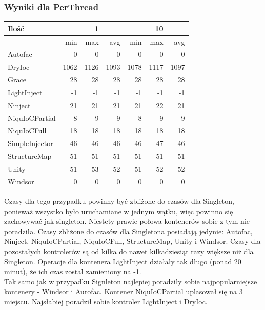 \documentclass[12pt]{article}
\begin{document}
\subsubsection{Wyniki dla PerThread}
\begin{center}
\begin{small}
	\begin{tabular}{ | l | r r r | r r r | }
    		\hline
     		Ilość & & 1 & & & 10 &  \\ \hline
     		 & min & max & avg & min & max & avg \\ \hline
		Autofac & 0 & 0 & 0 & 0 & 0 & 0 \\ \hline
		DryIoc & 1062 & 1126 & 1093 & 1078 & 1117 & 1097 \\ \hline
		Grace & 28 & 28 & 28 & 28 & 28 & 28 \\ \hline
		LightInject & -1 & -1 & -1 & -1 & -1 & -1 \\ \hline
		Ninject & 21 & 21 & 21 & 21 & 22 & 21 \\ \hline
		NiquIoCPartial & 8 & 9 & 9 & 8 & 9 & 9 \\ \hline
		NiquIoCFull & 18 & 18 & 18 & 18 & 18 & 18 \\ \hline
		SimpleInjector & 46 & 46 & 46 & 46 & 47 & 46 \\ \hline
		StructureMap & 51 & 51 & 51 & 51 & 51 & 51 \\ \hline
		Unity & 51 & 53 & 52 & 51 & 52 & 52 \\ \hline
		Windsor & 0 & 0 & 0 & 0 & 0 & 0 \\
    		\hline
  	\end{tabular}
\end{small}
\end{center}
Czasy dla tego przypadku powinny być zbliżone do czasów dla Singleton, ponieważ wszystko było uruchamiane w jednym wątku, więc powinno się zachowywać jak singleton. Niestety prawie połowa kontenerów sobie z tym nie poradziła. Czasy zbliżone do czasów dla Singletona posiadają jedynie: Autofac, Ninject, NiquIoCPartial, NiquIoCFull, StructureMap, Unity i Windsor. Czasy dla pozostałych kontrolerów są od kilka do nawet kilkadziesiąt razy większe niż dla Singleton. Operacje dla kontenera LightInject działały tak długo (ponad 20 minut), że ich czas został zamieniony na -1.\\
Tak samo jak w przypadku Signleton najlepiej poradziły sobie najpopularniejsze kontenery - Windsor i Aurofac. Kontener NiquIoCPartial uplasował się na 3 miejscu. Najsłabiej poradził sobie kontroler LightInject i DryIoc.
\end{document}

